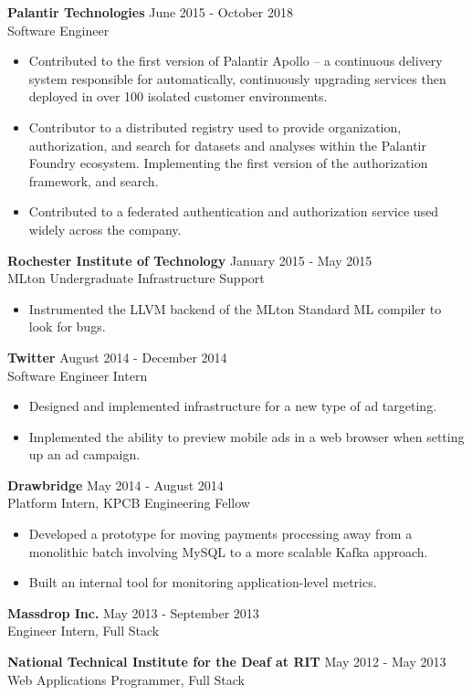 \documentclass[line,margin]{res}
\begin{document}
\begin{resume}
{\bf Palantir Technologies} \hfill June 2015 - October 2018 \\
Software Engineer
\begin{itemize}
\item Contributed to the first version of Palantir Apollo -- a continuous delivery system responsible for automatically, continuously upgrading services then deployed in over 100 isolated customer environments.
\item Contributor to a distributed registry used to provide organization, authorization, and search for datasets and analyses within the Palantir Foundry ecosystem. Implementing the first version of the authorization framework, and search.
\item Contributed to a federated authentication and authorization service used widely across the company.
\end{itemize}

{\bf  Rochester Institute of Technology} \hfill January 2015 - May 2015 \\
MLton Undergraduate Infrastructure Support
\begin{itemize}
\item Instrumented the LLVM backend of the MLton Standard ML compiler to look for bugs.
\end{itemize}

{\bf Twitter} \hfill August 2014 - December 2014 \\
Software Engineer Intern
\begin{itemize}
\item Designed and implemented infrastructure for a new type of ad targeting.
\item Implemented the ability to preview mobile ads in a web browser when setting up an ad campaign.
\end{itemize}

{\bf Drawbridge} \hfill May 2014 - August 2014 \\
Platform Intern, KPCB Engineering Fellow
\begin{itemize}
\item Developed a prototype for moving payments processing away from a monolithic batch involving MySQL to a more scalable Kafka approach.
\item Built an internal tool for monitoring application-level metrics.
\end{itemize}

{\bf Massdrop Inc.} \hfill May 2013 - September 2013\\
Engineer Intern, Full Stack

{\bf  National Technical Institute for the Deaf at RIT} \hfill May 2012 - May 2013\\
Web Applications Programmer, Full Stack

\end{resume}
\end{document}
